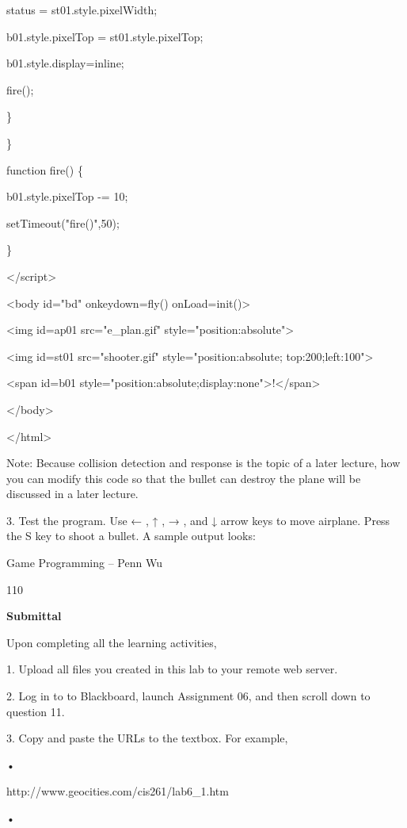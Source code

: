 \documentclass[
]{article}
\begin{document}
status = st01.style.pixelWidth;

b01.style.pixelTop = st01.style.pixelTop;

b01.style.display=\textquotesingle inline\textquotesingle;

fire();

\}

\}

function fire() \{

b01.style.pixelTop -= 10;

setTimeout("fire()",50);

\}

\textless/script\textgreater{}

\textless body id="bd" onkeydown=fly() onLoad=init()\textgreater{}

\textless img id=ap01 src="e\_plan.gif"
style="position:absolute"\textgreater{}

\textless img id=st01 src="shooter.gif" style="position:absolute;
top:200;left:100"\textgreater{}

\textless span id=b01
style="position:absolute;display:none"\textgreater!\textless/span\textgreater{}

\textless/body\textgreater{}

\textless/html\textgreater{}

Note: Because collision detection and response is the topic of a later
lecture, how you can modify this code so that the bullet can destroy the
plane will be discussed in a later lecture.

3. Test the program. Use ← , ↑ , → , and ↓ arrow keys to move airplane.
Press the S key to shoot a bullet. A sample output looks:

Game Programming -- Penn Wu

110

\protect\hypertarget{index_split_007.htmlux5cux23p111}{}{}

\textbf{Submittal}

Upon completing all the learning activities,

1. Upload all files you created in this lab to your remote web server.

2. Log in to to Blackboard, launch Assignment 06, and then scroll down
to question 11.

3. Copy and paste the URLs to the textbox. For example,

•

http://www.geocities.com/cis261/lab6\_1.htm

•
\end{document}
